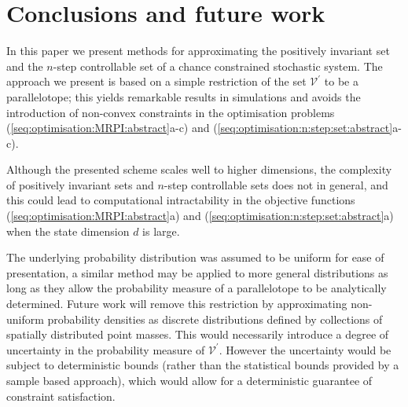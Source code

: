 \documentclass{ifacconf}
\providecommand{\V}{\mathcal V}
\begin{document}
\section{Conclusions and future work}\label{sec:conclusion}
%
%
In this paper we present methods for approximating the positively invariant set and the $n$-step controllable set of a chance constrained stochastic system.
%
%
The approach we present is based on a simple restriction of the set $\V^\prime$ to be a parallelotope; this yields remarkable results in simulations and avoids the introduction of non-convex constraints in the optimisation problems (\ref{seq:optimisation:MRPI:abstract}a-c) and \mbox{(\ref{seq:optimisation:n:step:set:abstract}a-c)}.

Although the presented scheme scales well to higher dimensions, the complexity of positively invariant sets and $n$-step controllable sets does not in general, and this could lead to computational intractability in the objective functions (\ref{seq:optimisation:MRPI:abstract}a) and (\ref{seq:optimisation:n:step:set:abstract}a) when the state dimension $d$ is large.
%

The underlying probability distribution was assumed to be uniform for ease of presentation, a similar method may be applied to more general distributions as long as they allow the probability measure of a parallelotope to be analytically determined.
%
Future work will remove this restriction by approximating non-uniform probability densities as discrete distributions defined by collections of spatially distributed point masses.
%
This would necessarily introduce a degree of uncertainty in the probability measure of $\V^\prime$. However the uncertainty would be subject to deterministic bounds (rather than the statistical bounds provided by a sample based approach), which would allow for a deterministic guarantee of constraint satisfaction. 



%

\end{document}
